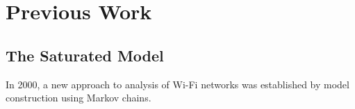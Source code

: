 \chapter{Previous Work}

\section{The Saturated Model}

In 2000, a new approach to analysis of Wi-Fi networks was established by model construction using Markov chains\cite{bianchi}.
